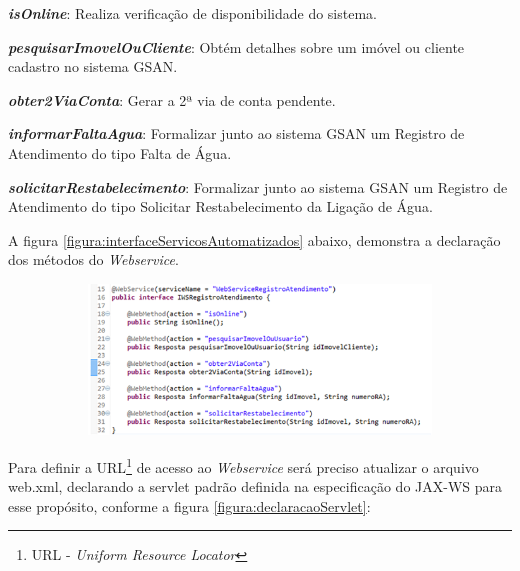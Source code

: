 \begin{description}
	\item \textbf{\textit{isOnline}}: Realiza verificação de disponibilidade do sistema.
	\item \textbf{\textit{pesquisarImovelOuCliente}}: Obtém detalhes sobre um imóvel ou cliente cadastro no sistema GSAN.
	\item \textbf{\textit{obter2ViaConta}}: Gerar a 2ª via de conta pendente.
	\item \textbf{\textit{informarFaltaAgua}}: Formalizar junto ao sistema GSAN um Registro de Atendimento do tipo Falta de Água.
	\item \textbf{\textit{solicitarRestabelecimento}}: Formalizar junto ao sistema GSAN um Registro de Atendimento do tipo Solicitar Restabelecimento da Ligação de Água.
\end{description}

A figura \ref{figura:interfaceServicosAutomatizados} abaixo, demonstra a declaração dos métodos do \textit{Webservice}.

\begin{figure}[H]
	\centering
	\caption{\textbf{Interface dos serviços automatizados.}}	
	\label{figura:interfaceServicosAutomatizados}
	\begin{subfigure}[H]{\textwidth}
		\centering
		\includegraphics{figuras/implementacao_servicos.png}
	\end{subfigure}
\end{figure}



Para definir a URL\footnote{URL - \textit{Uniform Resource Locator}} de acesso ao \textit{Webservice} será preciso atualizar o arquivo web.xml, declarando a servlet padrão definida na especificação do JAX-WS para esse propósito, conforme a figura \ref{figura:declaracaoServlet}:

